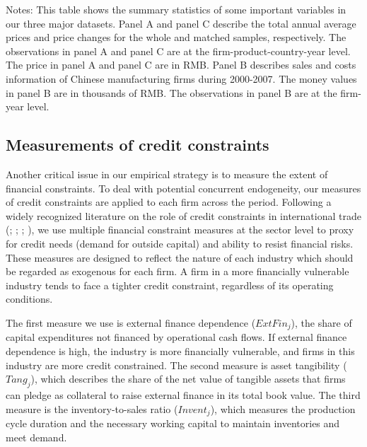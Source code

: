 \documentclass[12pt]{article}
\begin{document}
\begin{table}[htbp]
{\begin{threeparttable}
\begin{tabular}{lcccccc}
		\bottomrule
	\end{tabular}
	\begin{tablenotes}
		\footnotesize
		\item[Notes:] This table shows the summary statistics of some important variables in our three major datasets. Panel A and panel C describe the total annual average prices and price changes for the whole and matched samples, respectively. The observations in panel A and panel C are at the firm-product-country-year level. The price in panel A and panel C are in RMB. Panel B describes sales and costs information of Chinese manufacturing firms during 2000-2007. The money values in panel B are in thousands of RMB. The observations in panel B are at the firm-year level.
	\end{tablenotes}
	\end{threeparttable}
        }
\end{table}

\subsection{Measurements of credit constraints} \label{Measurements-Credit Constraints}

Another critical issue in our empirical strategy is to measure the extent of financial constraints. To deal with potential concurrent endogeneity, our measures of credit constraints are applied to each firm across the period. Following a widely recognized literature on the role of credit constraints in international trade (\cite{kroszner2007}; \cite{manova2013}; \cite{manova-wei-zhang2015}; \cite{fan-lai-li2015}), we use multiple financial constraint measures at the sector level to proxy for credit needs (demand for outside capital) and ability to resist financial risks. These measures are designed to reflect the nature of each industry which should be regarded as exogenous for each firm. A firm in a more financially vulnerable industry tends to face a tighter credit constraint, regardless of its operating conditions.

The first measure we use is external finance dependence ($ExtFin_j$), the share of capital expenditures not financed by operational cash flows. If external finance dependence is high, the industry is more financially vulnerable, and firms in this industry are more credit constrained. The second measure is asset tangibility ($Tang_j$), which describes the share of the net value of tangible assets that firms can pledge as collateral to raise external finance in its total book value. The third measure is the inventory-to-sales ratio ($Invent_j$), which measures the production cycle duration and the necessary working capital to maintain inventories and meet demand. 
\end{document}

